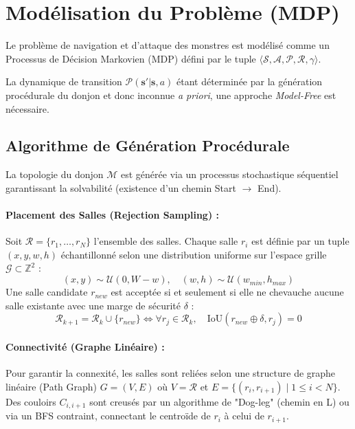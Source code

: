 \documentclass[12pt,a4paper]{article}
\newcommand{\state}{\mathbf{s}}
\newcommand{\action}{a}
\begin{document}
\section{Modélisation du Problème (MDP)}
Le problème de navigation et d'attaque des monstres est modélisé comme un Processus de Décision Markovien (MDP) défini par le tuple $\langle \mathcal{S}, \mathcal{A}, \mathcal{P}, \mathcal{R}, \gamma \rangle$.

La dynamique de transition $\mathcal{P}(\state'|\state, \action)$ étant déterminée par la génération procédurale du donjon et donc inconnue \textit{a priori}, une approche \textit{Model-Free} est nécessaire.

\subsection{Algorithme de Génération Procédurale}
La topologie du donjon $\mathcal{M}$ est générée via un processus stochastique séquentiel garantissant la solvabilité (existence d'un chemin Start $\to$ End).

\paragraph{Placement des Salles (Rejection Sampling) :}
Soit $\mathcal{R} = \{r_1, \dots, r_N\}$ l'ensemble des salles. Chaque salle $r_i$ est définie par un tuple $(x, y, w, h)$ échantillonné selon une distribution uniforme sur l'espace grille $\mathcal{G} \subset \mathbb{Z}^2$ :
\begin{equation}
    (x, y) \sim \mathcal{U}(0, W-w), \quad (w, h) \sim \mathcal{U}(w_{min}, h_{max})
\end{equation}
Une salle candidate $r_{new}$ est acceptée si et seulement si elle ne chevauche aucune salle existante avec une marge de sécurité $\delta$ :
\begin{equation}
    \mathcal{R}_{k+1} = \mathcal{R}_k \cup \{r_{new}\} \iff \forall r_j \in \mathcal{R}_k, \quad \text{IoU}(r_{new} \oplus \delta, r_j) = 0
\end{equation}

\paragraph{Connectivité (Graphe Linéaire) :}
Pour garantir la connexité, les salles sont reliées selon une structure de graphe linéaire (Path Graph) $G=(V, E)$ où $V=\mathcal{R}$ et $E=\{(r_i, r_{i+1}) \mid 1 \le i < N\}$.
Des couloirs $C_{i, i+1}$ sont creusés par un algorithme de "Dog-leg" (chemin en L) ou via un BFS contraint, connectant le centroïde de $r_i$ à celui de $r_{i+1}$.
\end{document}

